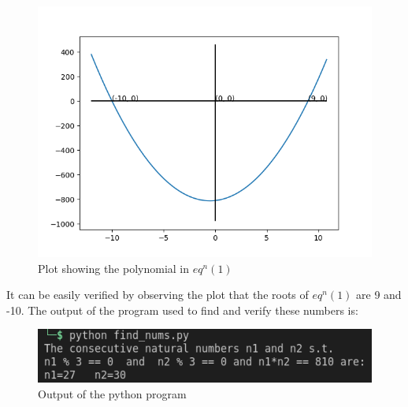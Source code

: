 \documentclass[11pt, letterpaper]{article}
\begin{document}
    \begin{figure}
        \includegraphics[width=\textwidth]{plot.png}
        \caption{Plot showing the polynomial in $eq^n(1)$}
    \end{figure}
    It can be easily verified by observing the plot that the roots of $eq^n (1)$ are 9 and -10.\newline
    \newline\newline
    The output of the program used to find and verify these numbers is:
    \begin{figure}
        \includegraphics[width=\textwidth]{output.png}
        \caption{Output of the python program}
    \end{figure}
\end{document}
